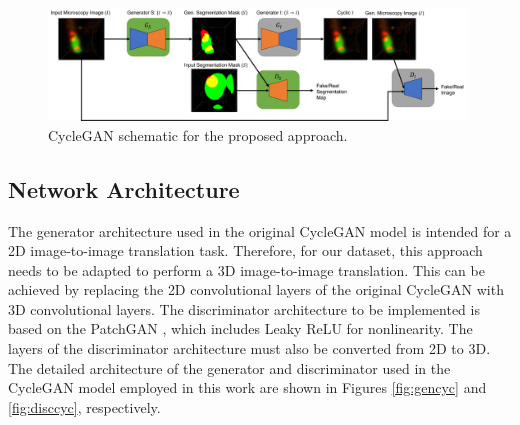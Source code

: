 \begin{figure}[!htb]
  \centering
  \includegraphics[width=0.99\textwidth]{Images/diagrama.jpg}
  \caption[CycleGAN schematic for the proposed approach.]{CycleGAN schematic for the proposed approach.}
  \label{fig:diagrama}
\end{figure}


\subsection*{Network Architecture}

The generator architecture used in the original CycleGAN model is intended for a \ac{2D} image-to-image translation task. Therefore, for our dataset, this approach needs to be adapted to perform a \ac{3D} image-to-image translation. This can be achieved by replacing the \ac{2D} convolutional layers of the original CycleGAN with \ac{3D} convolutional layers.  The discriminator architecture to be implemented is based on the PatchGAN \cite{isola2018imagetoimage}, which includes \ac{Leaky ReLU} for nonlinearity. The layers of the discriminator architecture must also be converted from \ac{2D} to \ac{3D}. The detailed architecture of the generator and discriminator used in the CycleGAN model employed in this work are shown in Figures \ref{fig:gencyc} and \ref{fig:disccyc}, respectively.

